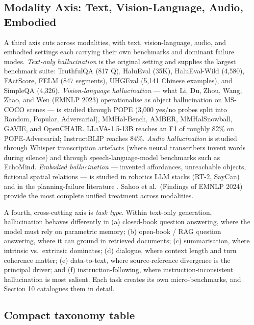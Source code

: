 \documentclass{article}
\begin{document}
\subsection{Modality Axis: Text, Vision-Language, Audio, Embodied}\label{modality-axis-text-vision-language-audio-embodied}

A third axis cuts across modalities, with text, vision-language, audio, and embodied settings each carrying their own benchmarks and dominant failure modes. \emph{Text-only hallucination} is the original setting and supplies the largest benchmark suite: TruthfulQA (817 Q), HaluEval (35K), HaluEval-Wild (4,580), FActScore, FELM (847 segments), UHGEval (5,141 Chinese examples), and SimpleQA (4,326). \emph{Vision-language hallucination} --- what Li, Du, Zhou, Wang, Zhao, and Wen (EMNLP 2023) operationalise as object hallucination on MS-COCO scenes --- is studied through POPE (3,000 yes/no probes split into Random, Popular, Adversarial), MMHal-Bench, AMBER, MMHalSnowball, GAVIE, and OpenCHAIR. LLaVA-1.5-13B reaches an F1 of roughly 82\% on POPE-Adversarial; InstructBLIP reaches 84\%. \emph{Audio hallucination} is studied through Whisper transcription artefacts (where neural transcribers invent words during silence) and through speech-language-model benchmarks such as EchoMind. \emph{Embodied hallucination} --- invented affordances, unreachable objects, fictional spatial relations --- is studied in robotics LLM stacks (RT-2, SayCan) and in the planning-failure literature \citep{park2024aideceptionasurvey}. Sahoo et al.~(Findings of EMNLP 2024) provide the most complete unified treatment across modalities.

A fourth, cross-cutting axis is \emph{task type}. Within text-only generation, hallucination behaves differently in (a) closed-book question answering, where the model must rely on parametric memory; (b) open-book / RAG question answering, where it can ground in retrieved documents; (c) summarisation, where intrinsic vs.~extrinsic dominates; (d) dialogue, where context length and turn coherence matter; (e) data-to-text, where source-reference divergence is the principal driver; and (f) instruction-following, where instruction-inconsistent hallucination is most salient. Each task creates its own micro-benchmarks, and Section 10 catalogues them in detail.

\subsection{Compact taxonomy table}\label{compact-taxonomy-table}
\end{document}
